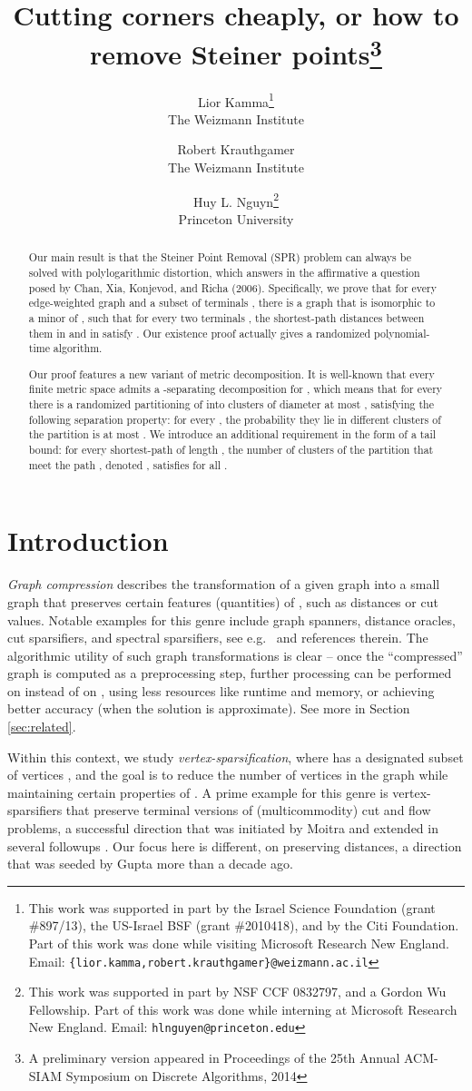 \documentclass[twoside,leqno,twocolumn]{article}
\title{Cutting corners cheaply, or how to remove Steiner points\thanks{A preliminary version appeared in Proceedings of the 25th Annual ACM-SIAM
Symposium on Discrete Algorithms, 2014}}
\author{Lior Kamma\thanks{This work was supported in part by the Israel Science Foundation (grant 
\#897/13), the US-Israel BSF (grant \#2010418), and by the Citi Foundation.
Part of this work was done while visiting Microsoft Research New England.
Email: \texttt{\{lior.kamma,robert.krauthgamer\}@weizmann.ac.il}
}
\\ The Weizmann Institute
\and Robert Krauthgamer\footnotemark[\value{footnote}]
\\ The Weizmann Institute
\and Huy L. Nguyn\thanks{This work was supported in part by NSF CCF 0832797, and a Gordon Wu Fellowship.
Part of this work was done while interning at Microsoft Research New England.
Email: \texttt{hlnguyen@princeton.edu}
}
\\ Princeton University
}
\date{}
\begin{document}
\maketitle

\begin{abstract}
\ifprocs
  \small \fi
Our main result is that the Steiner Point Removal (SPR) problem
can always be solved with polylogarithmic distortion,
which answers in the affirmative 
a question posed by Chan, Xia, Konjevod, and Richa (2006).
Specifically, we prove that for every edge-weighted graph 
and a subset of terminals , 
there is a graph  that is isomorphic to a minor of ,
such that for every two terminals ,
the shortest-path distances between them in  and in  satisfy
.
Our existence proof actually gives a randomized polynomial-time algorithm.

\ifprocs
  \small \fi
Our proof features a new variant of metric decomposition.
It is well-known that every finite metric space  admits 
a -separating decomposition for , 
which means that for every  there is a randomized 
partitioning of  into clusters of diameter at most ,
satisfying the following separation property:
for every , the probability they lie in different clusters 
of the partition is at most . 
We introduce an additional requirement in the form of a tail bound:
for every shortest-path  of length , 
the number of clusters of the partition that meet the path , denoted ,
satisfies  for all .
\end{abstract}


\section{Introduction}

\emph{Graph compression} describes the transformation of a given graph  
into a small graph  that preserves certain features (quantities) of ,
such as distances or cut values.
Notable examples for this genre include graph spanners, distance oracles,
cut sparsifiers, and spectral sparsifiers, 
see e.g.\ \cite{PS89,TZ05,BK96,BSS08} and references therein.
The algorithmic utility of such graph transformations is clear  -- 
once the ``compressed'' graph  is computed as a preprocessing step,
further processing can be performed on  instead of on ,
using less resources like runtime and memory, 
or achieving better accuracy (when the solution is approximate). 
See more in Section \ref{sec:related}.


Within this context, we study \emph{vertex-sparsification},
where  has a designated subset of vertices ,
and the goal is to reduce the number of vertices in the graph
while maintaining certain properties of .
A prime example for this genre is vertex-sparsifiers
that preserve terminal versions of (multicommodity) cut and flow problems, 
a successful direction that was initiated by Moitra \cite{Moitra09} 
and extended in several followups \cite{LM10,CLLM10,MM10,EGKRTT10,Chuzhoy12}.
Our focus here is different, on preserving distances, 
a direction that was seeded by Gupta \cite{Gupta01} more than a decade ago.
\end{document}
